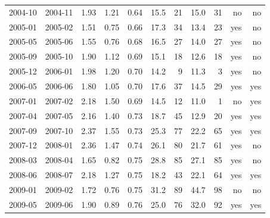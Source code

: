 \begin{table}[htbp]
\begin{tabular}{lrrrrrrrrrr}
2004-10 & 2004-11 & 1.93 & 1.21 & 0.64 & 15.5 & 21 & 15.0 & 31 & no & no \\
2005-01 & 2005-02 & 1.51 & 0.75 & 0.66 & 17.3 & 34 & 13.4 & 23 & yes & no \\
2005-05 & 2005-06 & 1.55 & 0.76 & 0.68 & 16.5 & 27 & 14.0 & 27 & yes & no \\
2005-09 & 2005-10 & 1.90 & 1.12 & 0.69 & 15.1 & 18 & 12.6 & 18 & yes & no \\
2005-12 & 2006-01 & 1.98 & 1.20 & 0.70 & 14.2 & 9 & 11.3 & 3 & yes & no \\
2006-05 & 2006-06 & 1.80 & 1.05 & 0.70 & 17.6 & 37 & 14.5 & 29 & yes & yes \\
2007-01 & 2007-02 & 2.18 & 1.50 & 0.69 & 14.5 & 12 & 11.0 & 1 & no & yes \\
2007-04 & 2007-05 & 2.16 & 1.40 & 0.73 & 18.7 & 45 & 12.9 & 20 & yes & yes \\
2007-09 & 2007-10 & 2.37 & 1.55 & 0.73 & 25.3 & 77 & 22.2 & 65 & yes & yes \\
2007-12 & 2008-01 & 2.36 & 1.47 & 0.74 & 26.1 & 80 & 21.7 & 61 & yes & no \\
2008-03 & 2008-04 & 1.65 & 0.82 & 0.75 & 28.8 & 85 & 27.1 & 85 & yes & no \\
2008-06 & 2008-07 & 2.18 & 1.27 & 0.75 & 18.2 & 43 & 22.1 & 64 & yes & yes \\
2009-01 & 2009-02 & 1.72 & 0.76 & 0.75 & 31.2 & 89 & 44.7 & 98 & no & no \\
2009-05 & 2009-06 & 1.90 & 0.89 & 0.76 & 25.0 & 76 & 32.0 & 92 & yes & yes \\
\bottomrule
\end{tabular}
\end{table}
